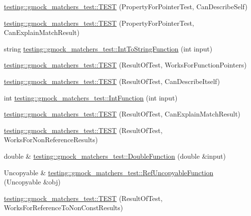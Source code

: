 \begin{DoxyCompactItemize}
\item 
\hyperlink{namespacetesting_1_1gmock__matchers__test_a064fc5dd5ca0106e8ed0fbc483472186}{testing\+::gmock\+\_\+matchers\+\_\+test\+::\+T\+E\+ST} (Property\+For\+Pointer\+Test, Can\+Describe\+Self)
\item 
\hyperlink{namespacetesting_1_1gmock__matchers__test_a1a7e2a9641a06e492d58c75d900330d3}{testing\+::gmock\+\_\+matchers\+\_\+test\+::\+T\+E\+ST} (Property\+For\+Pointer\+Test, Can\+Explain\+Match\+Result)
\item 
string \hyperlink{namespacetesting_1_1gmock__matchers__test_a2399c4fae49f898c02f57a42047d80f2}{testing\+::gmock\+\_\+matchers\+\_\+test\+::\+Int\+To\+String\+Function} (int input)
\item 
\hyperlink{namespacetesting_1_1gmock__matchers__test_a5aea17c7d3dd74cbc0cbf181b3a9e5f8}{testing\+::gmock\+\_\+matchers\+\_\+test\+::\+T\+E\+ST} (Result\+Of\+Test, Works\+For\+Function\+Pointers)
\item 
\hyperlink{namespacetesting_1_1gmock__matchers__test_a1b5240d2272b679d7e3035554c2c5688}{testing\+::gmock\+\_\+matchers\+\_\+test\+::\+T\+E\+ST} (Result\+Of\+Test, Can\+Describe\+Itself)
\item 
int \hyperlink{namespacetesting_1_1gmock__matchers__test_a6e957b9dcda1186c6274a8895d1514b5}{testing\+::gmock\+\_\+matchers\+\_\+test\+::\+Int\+Function} (int input)
\item 
\hyperlink{namespacetesting_1_1gmock__matchers__test_ab7fe283b2955ca8bb11b2984a08eef33}{testing\+::gmock\+\_\+matchers\+\_\+test\+::\+T\+E\+ST} (Result\+Of\+Test, Can\+Explain\+Match\+Result)
\item 
\hyperlink{namespacetesting_1_1gmock__matchers__test_a86f01e29ee48050d401fceca21d1041e}{testing\+::gmock\+\_\+matchers\+\_\+test\+::\+T\+E\+ST} (Result\+Of\+Test, Works\+For\+Non\+Reference\+Results)
\item 
double \& \hyperlink{namespacetesting_1_1gmock__matchers__test_a48350ba4c1ce65694ec07e9c1c49a452}{testing\+::gmock\+\_\+matchers\+\_\+test\+::\+Double\+Function} (double \&input)
\item 
Uncopyable \& \hyperlink{namespacetesting_1_1gmock__matchers__test_aa6f7dd285163d5880cfd6685bec8cab4}{testing\+::gmock\+\_\+matchers\+\_\+test\+::\+Ref\+Uncopyable\+Function} (Uncopyable \&obj)
\item 
\hyperlink{namespacetesting_1_1gmock__matchers__test_a505e866c4066d27854cb6754c66a3eec}{testing\+::gmock\+\_\+matchers\+\_\+test\+::\+T\+E\+ST} (Result\+Of\+Test, Works\+For\+Reference\+To\+Non\+Const\+Results)

\end{DoxyCompactItemize}
